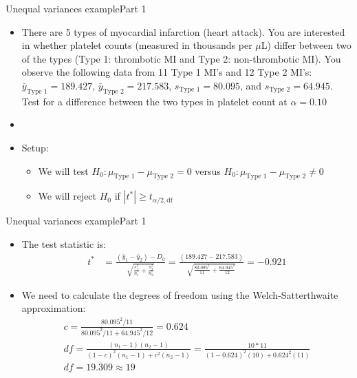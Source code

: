 \documentclass[xcolor=dvipsnames]{beamer}
\begin{document}
\begin{frame}{Unequal variances example}{Part 1}
	\begin{itemize}
		\item There are 5 types of myocardial infarction (heart attack). You are interested in whether platelet counts (measured in thousands per $\mu$L) differ between two of the types (Type 1: thrombotic MI and Type 2: non-thrombotic MI). You observe the following data from 11 Type 1 MI's and 12 Type 2 MI's: $\bar{y}_{\text{Type 1}}=189.427$, $\bar{y}_{\text{Type 2}}=217.583$, $s_{\text{Type 1}} = 80.095$, and $s_{\text{Type 2}} = 64.945$. Test for a difference between the two types in platelet count at $\alpha = 0.10$ \pause
		\item[]
		\item Setup:
		\begin{itemize}
			\item We will test $H_0: \mu_{\text{Type 1}} - \mu_{\text{Type 2}} =0$ versus $H_0: \mu_{\text{Type 1}} - \mu_{\text{Type 2}} \neq 0$ \pause
			\item We will reject $H_0$ if $|t^*| \geq t_{\alpha / 2, \text{df}}$
		\end{itemize}
	\end{itemize}
\end{frame}

\begin{frame}{Unequal variances example}{Part 1}
	\begin{itemize}
		\item The test statistic is: 
		\begin{align*}
		t^* &= \frac{(\bar{y}_1-\bar{y}_2)-D_0}{\sqrt{\frac{s^2_1}{n_1}+\frac{s^2_2}{n_2}}} = \frac{(189.427-217.583)}{\sqrt{\frac{80.095^2}{11}+\frac{64.945^2}{12}}} = -0.921
		\end{align*}\pause
		\item We need to calculate the degrees of freedom using the Welch-Satterthwaite approximation: \pause
		\begin{gather*}
			c = \frac{80.095^2 / 11}{80.095^2 / 11 + 64.945^2/12} = 0.624\\
			df = \frac{(n_1 -1)(n_2-1)}{(1-c)^2(n_1-1)+c^2(n_2-1)} = \frac{10*11}{(1-0.624)^2(10) + 0.624^2 (11)} \\
			df = 19.309 \approx 19
		\end{gather*}
	\end{itemize}
\end{frame}
\end{document}
